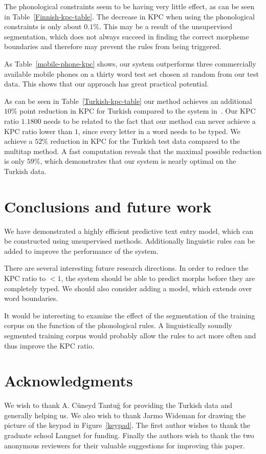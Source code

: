 \documentclass{llncs}
\begin{document}
The phonological constraints seem to be having very little effect, as
can be seen in Table~\ref{Finnish-kpc-table}. The decrease in KPC when
using the phonological constraints is only about $0.1\%$. This may be
a result of the unsupervised segmentation, which does not always
succeed in finding the correct morpheme boundaries and therefore may
prevent the rules from being triggered.

As Table~\ref{mobile-phone-kpc} shows, our system outperforms three
commercially available mobile phones on a thirty word test set chosen
at random from our test data. This shows that our approach has great
practical potential.

As can be seen in Table~\ref{Turkish-kpc-table} our method achieves an
additional $10\%$ point reduction in KPC for Turkish compared to the
system in~\cite{Tantug:2010}. Our KPC ratio $1.1800$ needs to be
related to the fact that our method can never achieve a KPC ratio
lower than $1$, since every letter in a word needs to be typed. We
achieve a $52\%$ reduction in KPC for the Turkish test data compared
to the multitap method. A fast computation reveals that the maximal
possible reduction is only $59\%$, which demonstrates that our
system is nearly optimal on the Turkish data.

\section{Conclusions and future work}\label{conclusion}

We have demonstrated a highly efficient predictive text entry model,
which can be constructed using unsupervised methods. Additionally
linguistic rules can be added to improve the performance of the
system.

There are several interesting future research directions. In order to
reduce the KPC ratio to $< 1$, the system should be able to predict
morphs before they are completely typed. We should also consider
adding a model, which extends over word boundaries.

It would be interesting to examine the effect of the segmentation of
the training corpus on the function of the phonological rules. A
linguistically soundly segmented training corpus would probably allow
the rules to act more often and thus improve the KPC ratio.

\section{Acknowledgments}
We wish to thank A. Cüneyd Tantu\u{g} for providing the Turkish data
and generally helping us. We also wish to thank Jarmo Wideman for
drawing the picture of the keypad in Figure~\ref{keypad}. The first
author wishes to thank the graduate school Langnet for
funding. Finally the authors wish to thank the two anonymous reviewers
for their valuable suggestions for improving this paper.




\end{document}
